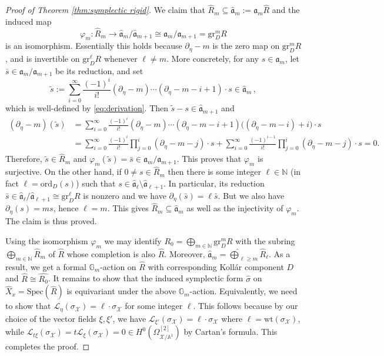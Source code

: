 \documentclass[12pt]{amsart}
\theoremstyle{definition}
\newcommand{\bA}{\mathbb{A}}
\newcommand{\bN}{\mathbb{N}}
\newcommand{\bG}{\mathbb{G}}
\newcommand{\cO}{\mathcal{O}}
\newcommand{\cL}{\mathcal{L}}
\newcommand{\scX}{\mathscr{X}}
\newcommand{\fa}{\mathfrak{a}}
\newcommand{\Spec}{\mathrm{Spec}}
\newcommand{\ord}{\mathrm{ord}}
\newcommand{\gr}{\mathrm{gr}}
\newcommand{\wt}{\mathrm{wt}}
\numberwithin{equation}{section}
\begin{document}
\begin{proof}[Proof of Theorem \ref{thm:symplectic rigid}]
We claim that $\widehat{R}_m\subseteq \widehat{\fa}_m:=\fa_m \widehat{R}$ and the induced map 
\[
\varphi_m\colon \widehat{R}_m\to \widehat{\fa}_m/\widehat{\fa}_{m+1}\cong \fa_m/\fa_{m+1} = \gr^m_D R
\]
is an isomorphism. Essentially this holds because $\partial_\eta-m$ is the zero map on $\gr_D^m R$, and is invertible on $\gr^{\ell}_D R$ whenever $\ell\neq m$. More concretely, for any $s\in \fa_m$, let $\bar{s}\in \fa_m/\fa_{m+1}$ be its reduction, and set
\[
\tilde{s}:=\sum_{i=0}^\infty \frac{(-1)^i}{i!} (\partial_\eta-m)\cdots(\partial_\eta-m-i+1)\cdot s \in \widehat{\fa}_m \, ,
\]
which is well-defined by \eqref{eq:derivation}. Then $\tilde{s}-s\in \widehat{\fa}_{m+1}$ and
\begin{align*}
(\partial_\eta-m)(\tilde{s}) & = \sum_{i=0}^\infty \frac{(-1)^i}{i!} (\partial_\eta-m)\cdots(\partial_\eta-m-i+1) \Big((\partial_\eta-m-i) +i\Big)\cdot s \\
& = \sum_{i=0}^\infty \frac{(-1)^i}{i!} \prod_{j=0}^i (\partial_\eta-m-j) \cdot s + \sum_{i=0}^\infty \frac{(-1)^{i-1}}{i!} \prod_{j=0}^i (\partial_\eta-m-j)\cdot s = 0.
\end{align*}
Therefore, $\tilde{s} \in \widehat{R}_m$ and $\varphi_m(\tilde{s})=\bar{s}\in \fa_m/\fa_{m+1}$. This proves that $\varphi_m$ is surjective. On the other hand, if $0\neq s\in \widehat{R}_m$ then there is some integer $\ell\in \bN$ (in fact $\ell = \ord_D(s)$) such that $s\in \widehat{\fa}_\ell \setminus \widehat{\fa}_{\ell+1}$. In particular, its reduction $\bar{s}\in \widehat{\fa}_\ell/\widehat{\fa}_{\ell+1}\cong \gr^\ell_D R$ is nonzero and we have $\partial_\eta (\bar{s})=\ell \bar{s}$. But we also have $\partial_\eta(s)=ms$, hence $\ell = m$. This gives $\widehat{R}_m\subseteq \widehat{\fa}_m$ as well as the injectivity of $\varphi_m$. The claim is thus proved. 

Using the isomorphism $\varphi_m$ we may identify $R_0=\bigoplus_{m\in\bN} \gr_D^m R$ with the subring $\bigoplus_{m\in\bN} \widehat{R}_m$ of $\widehat{R}$ whose completion is also $\widehat{R}$. Moreover, $\widehat{\fa}_m = \widehat{\bigoplus}_{\ell\ge m} \widehat{R}_\ell$. As a result, we get a formal $\bG_m$-action on $\widehat{R}$ with corresponding Koll\'ar component $D$ and $\widehat{R}\cong \widehat{R_0}$. It remains to show that the induced symplectic form $\widehat{\sigma}$ on $\widehat{X}_x = \Spec(\widehat{R})$ is equivariant under the above $\bG_m$-action. Equivalently, we need to show that $\cL_\eta(\sigma_{\scX})=\ell \cdot \sigma_\scX$ for some integer $\ell$. This follows because by our choice of the vector fields $\xi,\xi'$, we have $\cL_{\xi'}(\sigma_{\scX})=\ell \cdot \sigma_\scX$ where $\ell = \wt(\sigma_{\scX})$, while $\cL_{t\xi}(\sigma_{\scX}) = t\cL_{\xi}(\sigma_{\scX}) = 0 \in H^0(\Omega^{[2]}_{\scX/\bA^1})$ by Cartan's formula. This completes the proof.
\end{proof}
\end{document}
